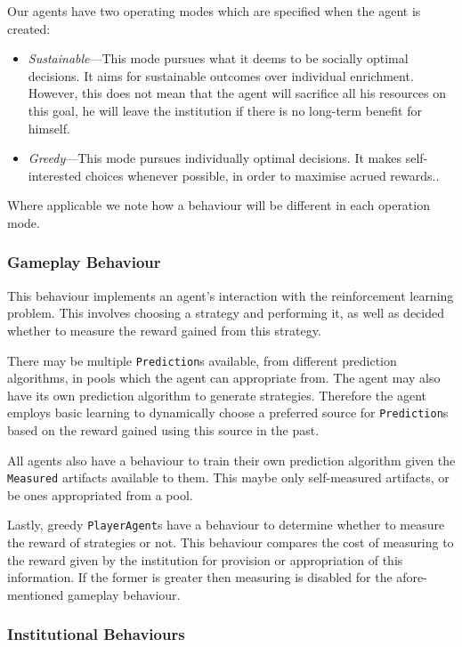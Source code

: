 Our agents have two operating modes which are specified when the agent is created:

\begin{itemize}
\item \emph{Sustainable}---This mode pursues what it deems to be socially optimal decisions. It aims for sustainable outcomes over individual enrichment. However, this does not mean that the agent will sacrifice all his resources on this goal, he will leave the institution if there is no long-term benefit for himself.
\item \emph{Greedy}---This mode pursues individually optimal decisions. It makes self-interested choices whenever possible, in order to maximise acrued rewards..
\end{itemize}

Where applicable we note how a behaviour will be different in each operation mode.

\subsubsection*{Gameplay Behaviour}

This behaviour implements an agent's interaction with the reinforcement
learning problem. This involves choosing a strategy and performing it, as well
as decided whether to measure the reward gained from this strategy.

There may be multiple \texttt{Prediction}s available, from different
prediction algorithms, in pools which the agent can appropriate from. The
agent may also have its own prediction algorithm to generate strategies.
Therefore the agent employs basic learning to dynamically choose a preferred
source for \texttt{Prediction}s based on the reward gained using this source
in the past.

All agents also have a behaviour to train their own prediction algorithm given the
\texttt{Measured} artifacts available to them. This maybe only self-measured
artifacts, or be ones appropriated from a pool.

Lastly, greedy \texttt{PlayerAgent}s have a behaviour to determine
whether to measure the reward of strategies or not. This behaviour compares the
cost of measuring to the reward given by the institution for provision or
appropriation of this information. If the former is greater then measuring is
disabled for the afore-mentioned gameplay behaviour.

\subsubsection*{Institutional Behaviours}

